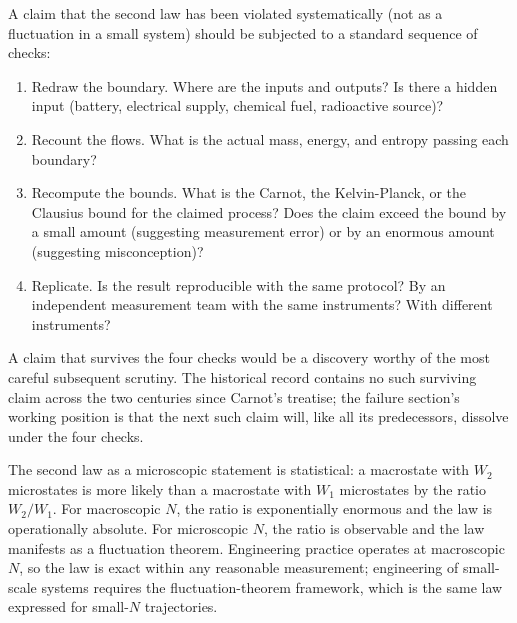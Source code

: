 A claim that the second law has been violated systematically (not as
a fluctuation in a small system) should be subjected to a standard
sequence of checks:

\begin{enumerate}[leftmargin=*]
  \item Redraw the boundary. Where are the inputs and outputs? Is
    there a hidden input (battery, electrical supply, chemical fuel,
    radioactive source)?
  \item Recount the flows. What is the actual mass, energy, and
    entropy passing each boundary?
  \item Recompute the bounds. What is the Carnot, the Kelvin-Planck,
    or the Clausius bound for the claimed process? Does the claim
    exceed the bound by a small amount (suggesting measurement error)
    or by an enormous amount (suggesting misconception)?
  \item Replicate. Is the result reproducible with the same protocol?
    By an independent measurement team with the same instruments?
    With different instruments?
\end{enumerate}

A claim that survives the four checks would be a discovery worthy of
the most careful subsequent scrutiny. The historical record contains
no such surviving claim across the two centuries since Carnot's
treatise; the failure section's working position is that the next
such claim will, like all its predecessors, dissolve under the four
checks.

\begin{principle}
The second law as a microscopic statement is statistical: a
macrostate with $W_2$ microstates is more likely than a macrostate
with $W_1$ microstates by the ratio $W_2/W_1$. For macroscopic $N$,
the ratio is exponentially enormous and the law is operationally
absolute. For microscopic $N$, the ratio is observable and the law
manifests as a fluctuation theorem. Engineering practice operates at
macroscopic $N$, so the law is exact within any reasonable
measurement; engineering of small-scale systems requires the
fluctuation-theorem framework, which is the same law expressed for
small-$N$ trajectories.
\end{principle}

